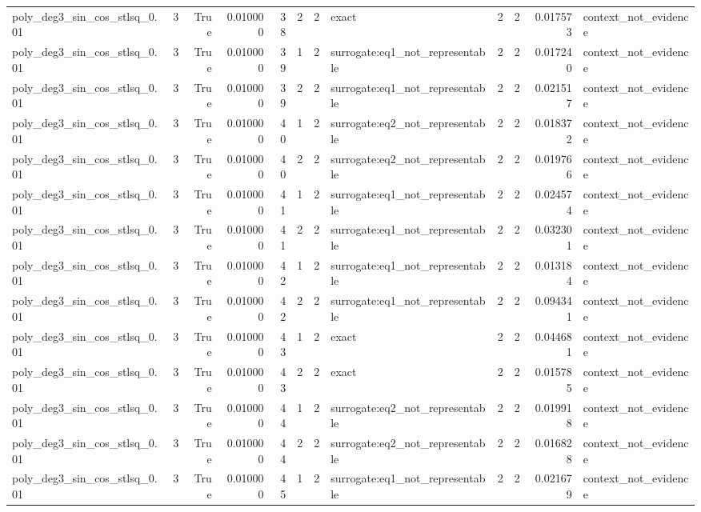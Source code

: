 \begin{tabular}{lrrrrrrlrrrl}
poly\_deg3\_sin\_cos\_stlsq\_0.01 & 3 & True & 0.010000 & 38 & 2 & 2 & exact & 2 & 2 & 0.017573 & context\_not\_evidence \\
poly\_deg3\_sin\_cos\_stlsq\_0.01 & 3 & True & 0.010000 & 39 & 1 & 2 & surrogate:eq1\_not\_representable & 2 & 2 & 0.017240 & context\_not\_evidence \\
poly\_deg3\_sin\_cos\_stlsq\_0.01 & 3 & True & 0.010000 & 39 & 2 & 2 & surrogate:eq1\_not\_representable & 2 & 2 & 0.021517 & context\_not\_evidence \\
poly\_deg3\_sin\_cos\_stlsq\_0.01 & 3 & True & 0.010000 & 40 & 1 & 2 & surrogate:eq2\_not\_representable & 2 & 2 & 0.018372 & context\_not\_evidence \\
poly\_deg3\_sin\_cos\_stlsq\_0.01 & 3 & True & 0.010000 & 40 & 2 & 2 & surrogate:eq2\_not\_representable & 2 & 2 & 0.019766 & context\_not\_evidence \\
poly\_deg3\_sin\_cos\_stlsq\_0.01 & 3 & True & 0.010000 & 41 & 1 & 2 & surrogate:eq1\_not\_representable & 2 & 2 & 0.024574 & context\_not\_evidence \\
poly\_deg3\_sin\_cos\_stlsq\_0.01 & 3 & True & 0.010000 & 41 & 2 & 2 & surrogate:eq1\_not\_representable & 2 & 2 & 0.032301 & context\_not\_evidence \\
poly\_deg3\_sin\_cos\_stlsq\_0.01 & 3 & True & 0.010000 & 42 & 1 & 2 & surrogate:eq1\_not\_representable & 2 & 2 & 0.013184 & context\_not\_evidence \\
poly\_deg3\_sin\_cos\_stlsq\_0.01 & 3 & True & 0.010000 & 42 & 2 & 2 & surrogate:eq1\_not\_representable & 2 & 2 & 0.094341 & context\_not\_evidence \\
poly\_deg3\_sin\_cos\_stlsq\_0.01 & 3 & True & 0.010000 & 43 & 1 & 2 & exact & 2 & 2 & 0.044681 & context\_not\_evidence \\
poly\_deg3\_sin\_cos\_stlsq\_0.01 & 3 & True & 0.010000 & 43 & 2 & 2 & exact & 2 & 2 & 0.015785 & context\_not\_evidence \\
poly\_deg3\_sin\_cos\_stlsq\_0.01 & 3 & True & 0.010000 & 44 & 1 & 2 & surrogate:eq2\_not\_representable & 2 & 2 & 0.019918 & context\_not\_evidence \\
poly\_deg3\_sin\_cos\_stlsq\_0.01 & 3 & True & 0.010000 & 44 & 2 & 2 & surrogate:eq2\_not\_representable & 2 & 2 & 0.016828 & context\_not\_evidence \\
poly\_deg3\_sin\_cos\_stlsq\_0.01 & 3 & True & 0.010000 & 45 & 1 & 2 & surrogate:eq1\_not\_representable & 2 & 2 & 0.021679 & context\_not\_evidence \\

\end{tabular}
